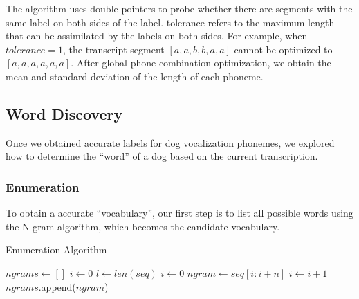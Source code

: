 
The algorithm uses double pointers to probe whether there are segments with the same label on both sides of the label. tolerance refers to the maximum length that can be assimilated by the labels on both sides. For example, when $tolerance=1$, the transcript segment $[a, a, b, b, a, a]$ cannot be optimized to $[a, a, a, a, a, a]$. After global phone combination optimization, we obtain the mean and standard deviation of the length of each phoneme.

\subsection{Word Discovery}

Once we obtained accurate labels for dog vocalization phonemes, we explored how to determine the ``word'' of a dog based on the current transcription.

\subsubsection{Enumeration}

To obtain a accurate ``vocabulary'', our first step is to list all possible words using the N-gram algorithm, which becomes the candidate vocabulary.
\begin{algorithm}
\caption{Enumeration Algorithm}\label{alg:cap}
\begin{algorithmic}
\State $ngrams \gets [ ]$
\State $i \gets 0$
\State $l \gets len(seq)$
\State $i \gets 0$
\State $ngram\gets seq[i:i+n]$
\State $i \gets i+1$
\State $ngrams$.append($ngram$)
\EndWhile
\EndFor
\end{algorithmic}
\end{algorithm}


